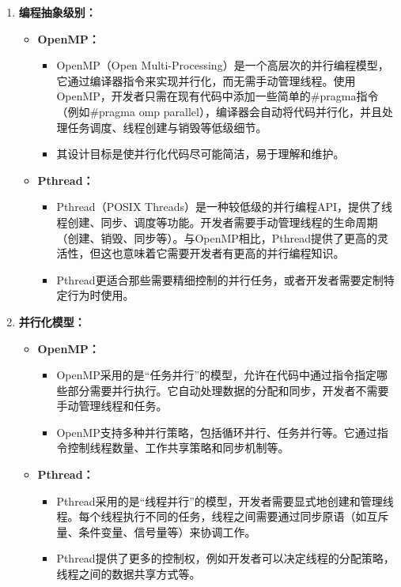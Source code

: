 \documentclass{nku}
\begin{document}
\begin{enumerate}
    \item \textbf{ 编程抽象级别：}
    \begin{itemize}
        \item \textbf{OpenMP：} 
        \begin{itemize}
            \item OpenMP（Open Multi-Processing）是一个高层次的并行编程模型，它通过编译器指令来实现并行化，而无需手动管理线程。使用OpenMP，开发者只需在现有代码中添加一些简单的\#pragma指令（例如\#pragma omp parallel），编译器会自动将代码并行化，并且处理任务调度、线程创建与销毁等低级细节。
            \item 其设计目标是使并行化代码尽可能简洁，易于理解和维护。
        \end{itemize}
        \item \textbf{Pthread：}
        \begin{itemize}
            \item Pthread（POSIX Threads）是一种较低级的并行编程API，提供了线程创建、同步、调度等功能。开发者需要手动管理线程的生命周期（创建、销毁、同步等）。与OpenMP相比，Pthread提供了更高的灵活性，但这也意味着它需要开发者有更高的并行编程知识。
            \item Pthread更适合那些需要精细控制的并行任务，或者开发者需要定制特定行为时使用。
        \end{itemize}
    \end{itemize}
    \item \textbf{ 并行化模型：}
    \begin{itemize}
        \item \textbf{OpenMP：}
        \begin{itemize}
            \item OpenMP采用的是“任务并行”的模型，允许在代码中通过指令指定哪些部分需要并行执行。它自动处理数据的分配和同步，开发者不需要手动管理线程和任务。
            \item OpenMP支持多种并行策略，包括循环并行、任务并行等。它通过指令控制线程数量、工作共享策略和同步机制等。
        \end{itemize}
        \item \textbf{Pthread：}
        \begin{itemize}
            \item Pthread采用的是“线程并行”的模型，开发者需要显式地创建和管理线程。每个线程执行不同的任务，线程之间需要通过同步原语（如互斥量、条件变量、信号量等）来协调工作。
            \item Pthread提供了更多的控制权，例如开发者可以决定线程的分配策略，线程之间的数据共享方式等。

\end{itemize}
\end{itemize}
\end{enumerate}
\end{document}
